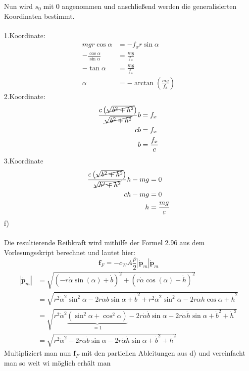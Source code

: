 Nun wird $s_0$ mit 0 angenommen und anschließend werden die generalisierten Koordinaten bestimmt. \\ \\
1.Koordinate:
\begin{align*}
	mgr\cos\alpha &= -f_xr\sin\alpha \\
	-\frac{\cos\alpha}{\sin\alpha} &= \frac{mg}{f_x}  \\
	-\tan\alpha &= \frac{mg}{f_x} \\
	\alpha &= -\arctan\left( \frac{mg}{f_x}\right)
\end{align*}
2.Koordinate:
\begin{align*}
	\frac{c\left(\cancel{\sqrt{b^2 + h^2}}\right)}{\cancel{\sqrt{b^2 + h^2}}} b &= f_x \\
	cb &= f_x \\
	b &= \frac{f_x}{c}
\end{align*}
3.Koordinate
\begin{align*}
	\frac{c\left(\cancel{\sqrt{b^2 + h^2}}\right)}{\cancel{\sqrt{b^2 + h^2}}} h -mg &= 0 \\
	ch - mg &= 0 \\
	h &= \frac{mg}{c}
\end{align*}
f) \\ \\
Die resultierende Reibkraft wird mithilfe der Formel 2.96 aus dem Vorlesungsskript berechnet und lautet hier:
\[
	\textbf{f}_F = -c_W A \frac{\rho}{2} |\dot{\textbf{p}}_m|\dot{\textbf{p}}_m
\]
\begin{align*}
	|\dot{\textbf{p}}_m| &= \sqrt{\left( -r \dot{\alpha}
		\sin \left( \alpha 
		\right) + \dot{b}\right)^2 
	+
	\left( 	r \dot{\alpha} \cos \left( \alpha  \right) -
	\dot{h}\right)^2} \\
	&= \sqrt{r^2\dot{\alpha}^2\sin^2\alpha -2r\dot{\alpha}\dot{b}\sin\alpha + \dot{b}^2 + r^2\dot{\alpha}^2\sin^2\alpha - 2r\dot{\alpha}\dot{h}\cos\alpha + \dot{h}^2} \\
	&= \sqrt{r^2\dot{\alpha}^2\underbrace{\left(\sin^2\alpha + \cos^2\alpha\right)}_{=1} - 2r\dot{\alpha}\dot{b}\sin\alpha - 2r\dot{\alpha}\dot{h}\sin\alpha + \dot{b}^2 + \dot{h}^2} \\
	&= \sqrt{r^2\dot{\alpha}^2 - 2r\dot{\alpha}\dot{b}\sin\alpha - 2r\dot{\alpha}\dot{h}\sin\alpha + \dot{b}^2 + \dot{h}^2}
\end{align*}
Multipliziert man nun $\textbf{f}_F$ mit den partiellen Ableitungen aus d) und vereinfacht man so weit wi möglich erhält man
